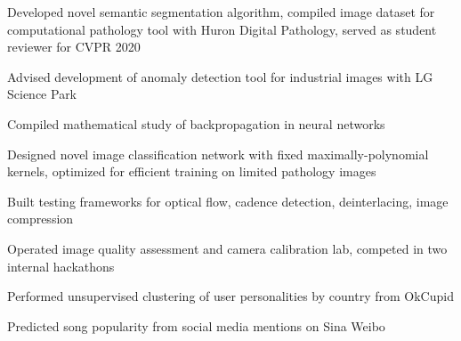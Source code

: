 \documentclass[letterpaper, 12pt]{cv_style}
\begin{document}
\begin{ditem}
	\item Developed novel semantic segmentation algorithm, compiled image dataset for computational pathology tool with Huron Digital Pathology, served as student reviewer for CVPR 2020\\
	\item Advised development of anomaly detection tool for industrial images with LG Science Park\\
	\item Compiled mathematical study of backpropagation in neural networks\\
\end{ditem}

%
\begin{ditem}
	\item Designed novel image classification network with fixed maximally-polynomial kernels, optimized for efficient training on limited pathology images
\end{ditem}
%
\begin{ditem}
	\item Built testing frameworks for optical flow, cadence detection, deinterlacing, image compression
	\item Operated image quality assessment and camera calibration lab, competed in two internal hackathons
\end{ditem}
%
\begin{ditem}
	\item Performed unsupervised clustering of user personalities by country from OkCupid
	\item Predicted song popularity from social media mentions on Sina Weibo
\end{ditem}
%
\end{document}
